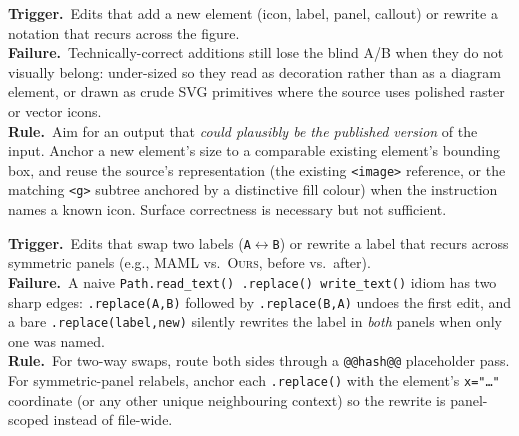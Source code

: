 \documentclass[11pt]{article}
\begin{document}
\begin{tcolorbox}[
  enhanced, breakable,
  colback=cardVisual!4!white, colframe=cardVisual,
  colbacktitle=cardVisual, coltitle=white,
  fonttitle=\bfseries\small,
  title={Match the Visual Register\hfill \scriptsize\textsc{Visual fidelity}},
  boxrule=0.4pt, arc=2pt,
  left=4pt, right=4pt, top=4pt, bottom=4pt,
  before skip=4pt, after skip=4pt
]
\small
\textbf{Trigger.}\ Edits that add a new element (icon, label,
panel, callout) or rewrite a notation that recurs across the
figure.\\[2pt]
\textbf{Failure.}\ Technically-correct additions still lose the
blind A/B when they do not visually belong: under-sized so they
read as decoration rather than as a diagram element, or drawn
as crude SVG primitives where the source uses polished raster
or vector icons.\\[2pt]
\textbf{Rule.}\ Aim for an output that \emph{could plausibly be
the published version} of the input.  Anchor a new element's
size to a comparable existing element's bounding box, and
reuse the source's representation (the existing
\texttt{<image>} reference, or the matching \texttt{<g>}
subtree anchored by a distinctive fill colour) when the
instruction names a known icon.  Surface correctness is
necessary but not sufficient.
\end{tcolorbox}

\begin{tcolorbox}[
  enhanced, breakable,
  colback=cardExec!4!white, colframe=cardExec,
  colbacktitle=cardExec, coltitle=white,
  fonttitle=\bfseries\small,
  title={Anchored String Replace\hfill \scriptsize\textsc{Edit execution}},
  boxrule=0.4pt, arc=2pt,
  left=4pt, right=4pt, top=4pt, bottom=4pt,
  before skip=4pt, after skip=4pt
]
\small
\textbf{Trigger.}\ Edits that swap two labels
(\texttt{A}$\leftrightarrow$\texttt{B}) or rewrite a label that
recurs across symmetric panels (e.g.,
\textsc{MAML} vs.\ \textsc{Ours}, before vs.\ after).\\[2pt]
\textbf{Failure.}\ A naive \texttt{Path.read\_text()
{\textrightarrow} .replace() {\textrightarrow} write\_text()}
idiom has two sharp edges: \texttt{.replace(A,B)} followed by
\texttt{.replace(B,A)} undoes the first edit, and a bare
\texttt{.replace(label,new)} silently rewrites the label in
\emph{both} panels when only one was named.\\[2pt]
\textbf{Rule.}\ For two-way swaps, route both sides through a
\texttt{@@hash@@} placeholder pass.  For symmetric-panel
relabels, anchor each \texttt{.replace()} with the element's
\texttt{x="\ldots"} coordinate (or any other unique
neighbouring context) so the rewrite is panel-scoped instead of
file-wide.
\end{tcolorbox}
\end{document}
